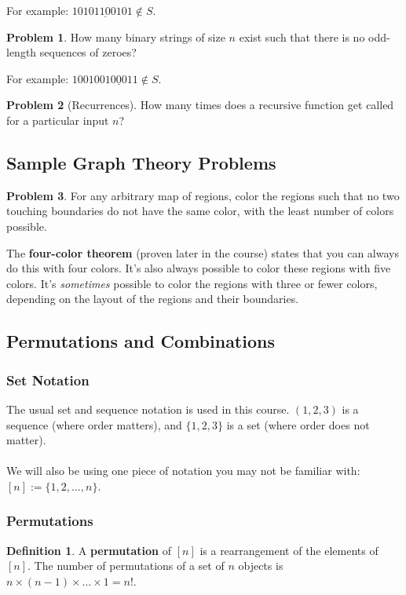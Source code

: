 \documentclass[]{article}
\theoremstyle{definition}
\newtheorem{problem}{Problem}[section]
\newtheorem{defn}{Definition}[section]
\begin{document}
			For example: $1010\underline{1100}101 \not \in S$.
		
			\begin{problem}
				How many binary strings of size $n$ exist such that there is no odd-length sequences of zeroes? 
			\end{problem}
		
			For example: $1001001\underline{000}11 \not \in S$.
		
			\begin{problem}[Recurrences]
				How many times does a recursive function get called for a particular input $n$?
			\end{problem}
		
		\subsection{Sample Graph Theory Problems}
			\begin{problem}
				For any arbitrary map of regions, color the regions such that no two touching boundaries do not have the same color, with the least number of colors possible.
			\end{problem}
		
			The \textbf{four-color theorem} (proven later in the course) states that you can always do this with four colors. It's also always possible to color these regions with five colors. It's \emph{sometimes} possible to color the regions with three or fewer colors, depending on the layout of the regions and their boundaries.
		
		\subsection{Permutations and Combinations}
			\subsubsection{Set Notation}
				The usual set and sequence notation is used in this course. $(1, 2, 3)$ is a sequence (where order matters), and $\{1, 2, 3\}$ is a set (where order does not matter).
				\\ \\
				We will also be using one piece of notation you may not be familiar with: $[n] := \{1, 2, \ldots, n\}$.

			\subsubsection{Permutations}
				\begin{defn}
					A \textbf{permutation} of $[n]$ is a rearrangement of the elements of $[n]$. The number of permutations of a set of $n$ objects is $n \times (n - 1) \times \ldots \times 1 = n!$. 
				\end{defn}
			
\end{document}

